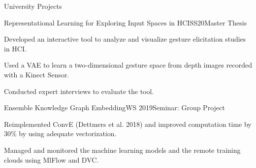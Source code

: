 \documentclass{resume} %
\begin{document}
\begin{rSection}{University Projects}

\begin{rSubsection}{Representational Learning for Exploring Input Spaces in HCI}{SS20}{Master Thesis}{}
\item Developed an interactive tool to analyze and visualize gesture elicitation studies in HCI.
\item Used a VAE to learn a two-dimensional gesture space from depth images recorded with a Kinect Sensor.
\item Conducted expert interviews to evaluate the tool.
\end{rSubsection}

\vfill

\begin{rSubsection}{Ensemble Knowledge Graph Embedding}{WS 2019}{Seminar: Group Project}{}
\item Reimplemented ConvE (Dettmers et al. 2018) and improved computation time by 30\% by using adequate vectorization.
\item Managed and monitored the machine learning models and the remote training clouds using MlFlow and DVC.
\end{rSubsection}



\end{rSection}
\end{document}
